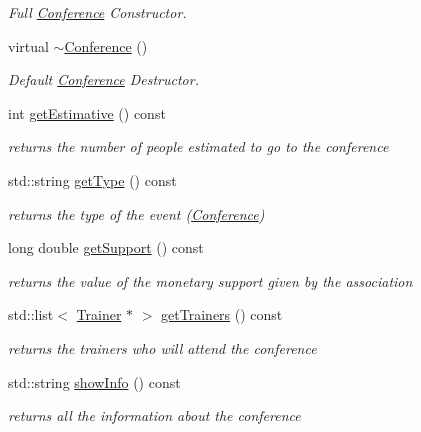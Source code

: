 \begin{DoxyCompactItemize}
\begin{DoxyCompactList}\small\item\em Full \mbox{\hyperlink{classConference}{Conference}} Constructor. \end{DoxyCompactList}\item 
virtual \mbox{\hyperlink{classConference_aad7fc5f411279abc70d4ff3c30d2bdd8}{$\sim$\+Conference}} ()
\begin{DoxyCompactList}\small\item\em Default \mbox{\hyperlink{classConference}{Conference}} Destructor. \end{DoxyCompactList}\item 
int \mbox{\hyperlink{classConference_a9d96f80eb37bdbf57bf318c8bd484e88}{get\+Estimative}} () const
\begin{DoxyCompactList}\small\item\em returns the number of people estimated to go to the conference \end{DoxyCompactList}\item 
std\+::string \mbox{\hyperlink{classConference_ad1cf07b29a4c4cc36483603ef9536186}{get\+Type}} () const
\begin{DoxyCompactList}\small\item\em returns the type of the event (\mbox{\hyperlink{classConference}{Conference}}) \end{DoxyCompactList}\item 
long double \mbox{\hyperlink{classConference_a6ca3f0f7b2714881dbc108ea7f08646f}{get\+Support}} () const
\begin{DoxyCompactList}\small\item\em returns the value of the monetary support given by the association \end{DoxyCompactList}\item 
std\+::list$<$ \mbox{\hyperlink{classTrainer}{Trainer}} $\ast$ $>$ \mbox{\hyperlink{classConference_aae9e92d48205a80fa42e94564e3568c5}{get\+Trainers}} () const
\begin{DoxyCompactList}\small\item\em returns the trainers who will attend the conference \end{DoxyCompactList}\item 
std\+::string \mbox{\hyperlink{classConference_a7a2f7b38c728f487d82356d3c671ef88}{show\+Info}} () const
\begin{DoxyCompactList}\small\item\em returns all the information about the conference \end{DoxyCompactList}\end{DoxyCompactItemize}
